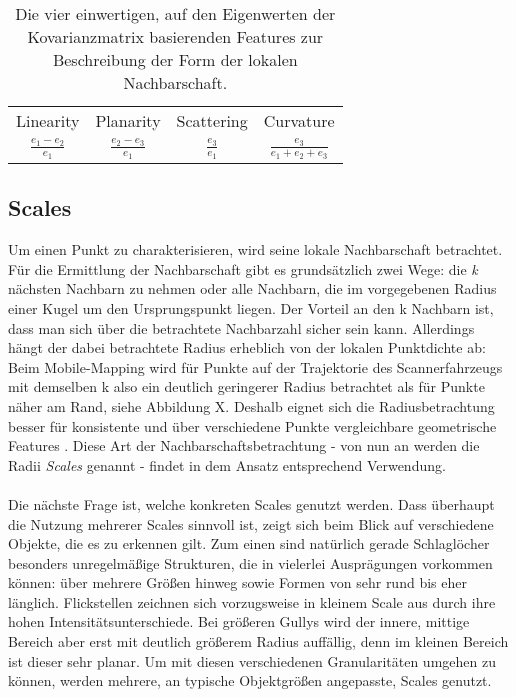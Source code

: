 \begin{table}
\centering
\begin{tabular}{c|c|c|c}
Linearity & Planarity & Scattering & Curvature \\ 
$\frac{e_1 - e_2}{e_1}$ & $\frac{e_2 - e_3}{e_1}$ & $\frac{e_3}{e_1}$ & $\frac{e_3}{e_1 + e_2 + e_3}$ \\
\end{tabular}
\caption{Die vier einwertigen, auf den Eigenwerten der Kovarianzmatrix basierenden Features zur Beschreibung der Form der lokalen Nachbarschaft.}
\label{table:eigenvalue_features}
\end{table}

\subsection{Scales}

Um einen Punkt zu charakterisieren, wird seine lokale Nachbarschaft betrachtet. Für die Ermittlung der Nachbarschaft gibt es grundsätzlich zwei Wege: die \textit{k} nächsten Nachbarn zu nehmen oder alle Nachbarn, die im vorgegebenen Radius einer Kugel um den Ursprungspunkt liegen. Der Vorteil an den k Nachbarn ist, dass man sich über die betrachtete Nachbarzahl sicher sein kann. Allerdings hängt der dabei betrachtete Radius erheblich von der lokalen Punktdichte ab: Beim Mobile-Mapping wird für Punkte auf der Trajektorie des Scannerfahrzeugs mit demselben k also ein deutlich geringerer Radius betrachtet als für Punkte näher am Rand, siehe Abbildung X. Deshalb eignet sich die Radiusbetrachtung besser für konsistente und über verschiedene Punkte vergleichbare geometrische Features \citep{Thomas.etal-2018}. Diese Art der Nachbarschaftsbetrachtung - von nun an werden die Radii \textit{Scales} genannt - findet in dem Ansatz entsprechend Verwendung. \\\\
Die nächste Frage ist, welche konkreten Scales genutzt werden. Dass überhaupt die Nutzung mehrerer Scales sinnvoll ist, zeigt sich beim Blick auf verschiedene Objekte, die es zu erkennen gilt. Zum einen sind natürlich gerade Schlaglöcher besonders unregelmäßige Strukturen, die in vielerlei Ausprägungen vorkommen können: über mehrere Größen hinweg sowie Formen von sehr rund bis eher länglich. Flickstellen zeichnen sich vorzugsweise in kleinem Scale aus durch ihre hohen Intensitätsunterschiede. Bei größeren Gullys wird der innere, mittige Bereich aber erst mit deutlich größerem Radius auffällig, denn im kleinen Bereich ist dieser sehr planar. Um mit diesen verschiedenen Granularitäten umgehen zu können, werden mehrere, an typische Objektgrößen angepasste, Scales genutzt.

